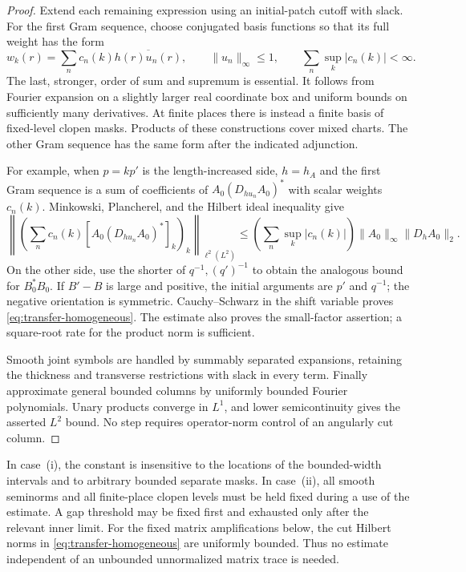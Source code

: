 \begin{proof}
Extend each remaining expression using an initial-patch cutoff with
slack. For the first Gram sequence, choose conjugated basis functions
so that its full weight has the form
\begin{equation}
 w_k(r)=\sum_n c_n(k)\overline{h(r)u_n(r)},\qquad
 \|u_n\|_\infty\leq1,\qquad
 \sum_n\sup_k|c_n(k)|<\infty.
 \label{eq:transfer-unary-expansion}
\end{equation}
The last, stronger, order of sum and supremum is essential. It follows
from Fourier expansion on a slightly larger real coordinate box and
uniform bounds on sufficiently many derivatives. At finite places
there is instead a finite basis of fixed-level clopen masks. Products
of these constructions cover mixed charts. The other Gram sequence
has the same form after the indicated adjunction.

For example, when $p=kp'$ is the length-increased side, $h=h_A$
and the first Gram
sequence is a sum of coefficients of
$A_0(D_{hu_n}A_0)^*$ with scalar weights $c_n(k)$. Minkowski,
Plancherel, and the Hilbert ideal inequality give
\[
 \left\|\left(\sum_n c_n(k)
      [A_0(D_{hu_n}A_0)^*]_k\right)_k\right\|_{\ell^2(L^2)}
 \leq
 \left(\sum_n\sup_k|c_n(k)|\right)
 \|A_0\|_\infty\|D_hA_0\|_2.
\]
On the other side, use the shorter of $q^{-1},(q')^{-1}$ to obtain
the analogous bound for $B_0^*B_0$. If $B'-B$ is large and positive,
the initial arguments are $p'$ and $q^{-1}$; the negative orientation
is symmetric. Cauchy--Schwarz in the shift variable proves
\eqref{eq:transfer-homogeneous}. The estimate also proves the
small-factor assertion; a square-root rate for the product norm is
sufficient.

Smooth joint symbols are handled by summably separated expansions,
retaining the thickness and transverse restrictions with slack in
every term. Finally approximate general bounded columns by uniformly
bounded Fourier polynomials. Unary products converge in $L^1$, and
lower semicontinuity gives the asserted $L^2$ bound. No step requires
operator-norm control of an angularly cut column.
\end{proof}

\begin{remark}
\label{rem:transfer-uniformity}
In case~\textup{(i)}, the constant is insensitive to the locations of
the bounded-width intervals and to arbitrary bounded separate masks.
In case~\textup{(ii)}, all smooth seminorms and all finite-place clopen
levels must be held fixed during a use of the estimate. A gap threshold
may be fixed first and exhausted only after the relevant inner limit.
For the fixed matrix amplifications below, the cut Hilbert norms in
\eqref{eq:transfer-homogeneous} are uniformly bounded. Thus no estimate
independent of an unbounded unnormalized matrix trace is needed.
\end{remark}

